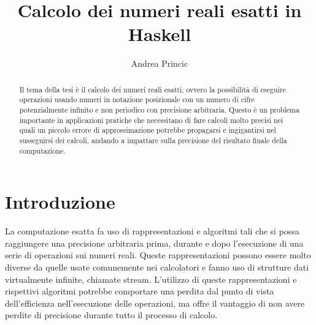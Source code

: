 \documentclass[Lau,oneside]{sapthesis}
\title{Calcolo dei numeri reali esatti in Haskell}
\author{Andrea Princic}
\begin{document}
\frontmatter
\maketitle



\begin{abstract}
Il tema della tesi è il calcolo dei numeri reali esatti, ovvero la possibilità 
di eseguire operazioni usando numeri in notazione posizionale con un numero di cifre 
potenzialmente infinito e non periodico con precisione arbitraria. Questo è un 
problema importante in applicazioni pratiche che necessitano di fare calcoli 
molto precisi nei quali un piccolo errore di approssimazione potrebbe propagarsi 
e ingigantirsi nel susseguirsi dei calcoli, andando a impattare sulla precisione 
del risultato finale della computazione.
\end{abstract}



\tableofcontents



\mainmatter



\chapter*{Introduzione}
La computazione esatta fa uso di rappresentazioni e algoritmi tali che si possa raggiungere una precisione arbitraria prima, durante e dopo l'esecuzione di una serie di operazioni sui numeri reali. Queste rappresentazioni possono essere molto diverse da quelle usate comunemente nei calcolatori e fanno uso di strutture dati virtualmente infinite, chiamate stream. L'utilizzo di queste rappresentazioni e rispettivi algoritmi potrebbe comportare una perdita dal punto di vista dell'efficienza nell'esecuzione delle operazioni, ma offre il vantaggio di non avere perdite di precisione durante tutto il processo di calcolo.
\end{document}
